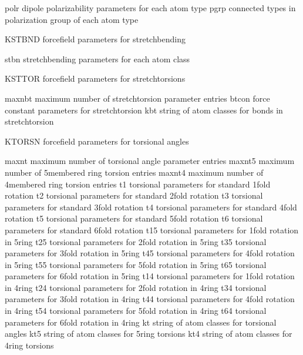 \documentclass[letterpaper,11pt,english]{sphinxmanual}
\begin{document}
polr    dipole polarizability parameters for each atom type
pgrp    connected types in polarization group of each atom type

KSTBND  forcefield parameters for stretch\sphinxhyphen{}bending

stbn    stretch\sphinxhyphen{}bending parameters for each atom class

KSTTOR  forcefield parameters for stretch\sphinxhyphen{}torsions

maxnbt  maximum number of stretch\sphinxhyphen{}torsion parameter entries
btcon   force constant parameters for stretch\sphinxhyphen{}torsion
kbt     string of atom classes for bonds in stretch\sphinxhyphen{}torsion

KTORSN  forcefield parameters for torsional angles

maxnt   maximum number of torsional angle parameter entries
maxnt5  maximum number of 5\sphinxhyphen{}membered ring torsion entries
maxnt4  maximum number of 4\sphinxhyphen{}membered ring torsion entries
t1      torsional parameters for standard 1\sphinxhyphen{}fold rotation
t2      torsional parameters for standard 2\sphinxhyphen{}fold rotation
t3      torsional parameters for standard 3\sphinxhyphen{}fold rotation
t4      torsional parameters for standard 4\sphinxhyphen{}fold rotation
t5      torsional parameters for standard 5\sphinxhyphen{}fold rotation
t6      torsional parameters for standard 6\sphinxhyphen{}fold rotation
t15     torsional parameters for 1\sphinxhyphen{}fold rotation in 5\sphinxhyphen{}ring
t25     torsional parameters for 2\sphinxhyphen{}fold rotation in 5\sphinxhyphen{}ring
t35     torsional parameters for 3\sphinxhyphen{}fold rotation in 5\sphinxhyphen{}ring
t45     torsional parameters for 4\sphinxhyphen{}fold rotation in 5\sphinxhyphen{}ring
t55     torsional parameters for 5\sphinxhyphen{}fold rotation in 5\sphinxhyphen{}ring
t65     torsional parameters for 6\sphinxhyphen{}fold rotation in 5\sphinxhyphen{}ring
t14     torsional parameters for 1\sphinxhyphen{}fold rotation in 4\sphinxhyphen{}ring
t24     torsional parameters for 2\sphinxhyphen{}fold rotation in 4\sphinxhyphen{}ring
t34     torsional parameters for 3\sphinxhyphen{}fold rotation in 4\sphinxhyphen{}ring
t44     torsional parameters for 4\sphinxhyphen{}fold rotation in 4\sphinxhyphen{}ring
t54     torsional parameters for 5\sphinxhyphen{}fold rotation in 4\sphinxhyphen{}ring
t64     torsional parameters for 6\sphinxhyphen{}fold rotation in 4\sphinxhyphen{}ring
kt      string of atom classes for torsional angles
kt5     string of atom classes for 5\sphinxhyphen{}ring torsions
kt4     string of atom classes for 4\sphinxhyphen{}ring torsions
\end{document}

